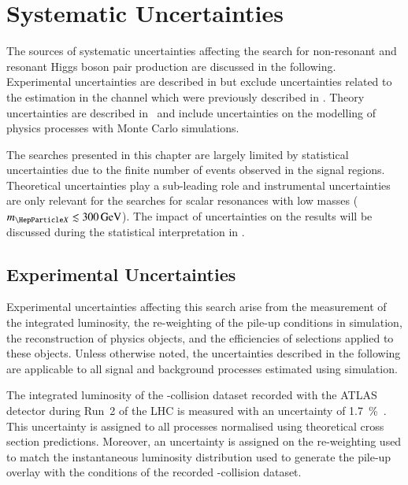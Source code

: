 \section{Systematic Uncertainties}%
\label{sec:uncertainties}

The sources of systematic uncertainties affecting the search for
non-resonant and resonant Higgs boson pair production are discussed in
the following. Experimental uncertainties are described in
 but exclude uncertainties
related to the \jettotauhadvis estimation in the \hadhad channel which
were previously described in
. Theory
uncertainties are described in~ and
include uncertainties on the modelling of physics processes with Monte
Carlo simulations.

The searches presented in this chapter are largely limited by
statistical uncertainties due to the finite number of events observed
in the signal regions. Theoretical uncertainties play a sub-leading
role and instrumental uncertainties are only relevant for the searches
for scalar resonances with low masses ($\mX \lesssim
\SI{300}{\GeV}$). The impact of uncertainties on the results will be
discussed during the statistical interpretation in
.


\subsection{Experimental Uncertainties}%
\label{sec:experimental_uncertainties}

Experimental uncertainties affecting this search arise from the
measurement of the integrated luminosity, the re-weighting of the
pile-up conditions in simulation, the reconstruction of physics
objects, and the efficiencies of selections applied to these
objects. Unless otherwise noted, the uncertainties described in the
following are applicable to all signal and background processes
estimated using simulation.

The integrated luminosity of the \pp-collision dataset recorded with
the ATLAS detector during Run~2 of the LHC is measured with an
uncertainty of \SI{1.7}{\percent}~\cite{ATLAS-CONF-2019-021}. This
uncertainty is assigned to all processes normalised using theoretical
cross section predictions. Moreover, an uncertainty is assigned on the
re-weighting used to match the instantaneous luminosity distribution
used to generate the pile-up overlay with the conditions of the
recorded \pp-collision dataset.

